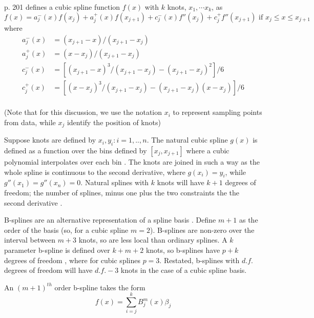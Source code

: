 \documentclass[phdcss]{SDSUThesis}
\begin{document}
\cite{wood-2017} p. 201 defines a cubic spline function $f(x)$ with $k$ knots, $x_1, \cdots x_k$, as
\begin{equation}
f(x) = a^-_j(x)f(x_j) + a^+_j(x) f(x_{j+1}) + c^-_j(x) f''(x_j) + c^+_j f''(x_{j+1}) \text{ if } x_j \le x \le x_{j+1}
\end{equation}
where 
\begin{equation}
\begin{aligned}
a^-_j(x) &= (x_{j+1}-x)/(x_{j+1}-x_{j}) \\
a^+_j(x) &= (x-x_j)/(x_{j+1}-x_{j}) \\
c^-_j(x) &= \left[ (x_{j+1} - x)^3/(x_{j+1}-x_{j}) - (x_{j+1}-x_{j})^2 \right] / 6\\
c^+_j(x) &= \left[ (x-x_j)^3/(x_{j+1}-x_{j}) - (x_{j+1}-x_{j})(x-x_j)\right] / 6\\
\end{aligned}
\end{equation}

(Note that for this discussion, we use the notation $x_i$ to represent sampling points from data, while $x_j$ identify the position of knots)

Suppose knots are defined by ${x_i, y_i : i=1,..,n}$. The natural cubic spline $g(x)$ is defined as a function over the bins defined by $[x_j, x_{j+1}]$ where a cubic polynomial interpolates over each bin \cite{wood-2017}. The knots are joined in such a way as the whole spline is continuous to the second derivative, where $g(x_i)=y_i$, while $g''(x_1) = g''(x_n) = 0$. Natural splines with $k$ knots will have $k+1$ degrees of freedom; the number of splines, minus one plus the two constraints the the second derivative \cite{perperoglou-2019}.

B-splines are an alternative representation of a spline basis \cite{wood-2017, perperoglou-2019}. Define $m+1$ as the order of the basis (so, for a cubic spline $m=2$). B-splines are non-zero over the interval between $m+3$ knots, so are less local than ordinary splines. A $k$ parameter b-spline is defined over $k+m+2$ knots\cite{wood-2017}, so b-splines have $p+k$ degrees of freedom \cite{perperoglou-2019}, where for cubic splines $p=3$. Restated, b-splines with $d.f.$ degrees of freedom will have $d.f.-3$ knots in the case of a cubic spline basis.

An $(m+1)^{th}$ order b-spline takes the form 
\begin{equation}
f(x) = \sum_{i=j}^k B^m_j(x) \beta_j
\end{equation}
\end{document}

